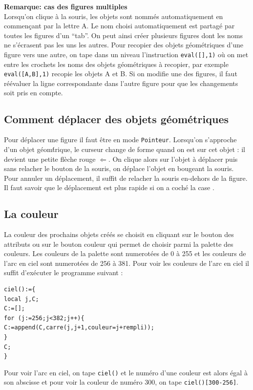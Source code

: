 \documentclass[a4paper,11pt]{article}
\begin{document}
{\bf Remarque: cas des figures multiples}\\
Lorsqu'on clique \`a la souris, les objets sont nomm\'es automatiquement
en commen\c{c}ant par la lettre A. Le nom choisi automatiquement est
partag\'e par toutes les figures d'un ``tab''. On peut ainsi cr\'eer
plusieurs figures dont les noms ne s'\'ecrasent pas les uns les autres.
Pour recopier des objets g\'eom\'etriques d'une figure vers une autre, on
tape dans un niveau
l'instruction {\tt eval([],1)} o\`u on met entre les crochets
les noms des objets g\'eom\'etriques \`a recopier, par exemple
{\tt eval([A,B],1)} recopie les objets A et B. Si on modifie une des
figures, il faut r\'e\'evaluer la ligne correspondante dans l'autre figure
pour que les changements soit pris en compte.

\subsection{Comment d\'eplacer des objets g\'eom\'etriques}\index{$\sim$}
Pour d\'eplacer une figure il faut \^etre en mode {\tt Pointeur}.
Lorsqu'on s'approche d'un objet g\'eom\'trique, le curseur change de forme 
quand on est sur cet objet : il devient une petite fl\`eche rouge $\Leftarrow$.
On clique alors sur l'objet \`a d\'eplacer puis sans relacher le bouton de la 
souris, on d\'eplace l'objet en bougeant la souris. Pour annuler
un d\'eplacement, il suffit de relacher la souris en-dehors de la figure.
Il faut savoir que le d\'eplacement est plus rapide si on a coch\'e la case
\framebox{$\sim$}.
 
\subsection{La couleur}
La couleur des prochains objets cr\'e\'es se choisit en cliquant sur le bouton 
des attributs ou sur le bouton couleur qui permet de choisir parmi la palette 
des couleurs. Les couleurs de la palette sont numerot\'ees de 0 \`a 255 et les
couleurs de l'arc en ciel sont numerot\'ees de 256 \`a 381. Pour voir les 
couleurs de l'arc en ciel il suffit d'ex\'ecuter le programme suivant :
\begin{verbatim}
ciel():={
local j,C;
C:=[];
for (j:=256;j<382;j++){
C:=append(C,carre(j,j+1,couleur=j+rempli));
}
C;
}
\end{verbatim}
Pour voir l'arc en ciel, on tape {\tt ciel()} et le num\'ero d'une couleur est 
alors \'egal \`a son abscisse et pour voir la couleur de num\'ero 300, on tape
{\tt ciel()[300-256]}.  
\end{document}
